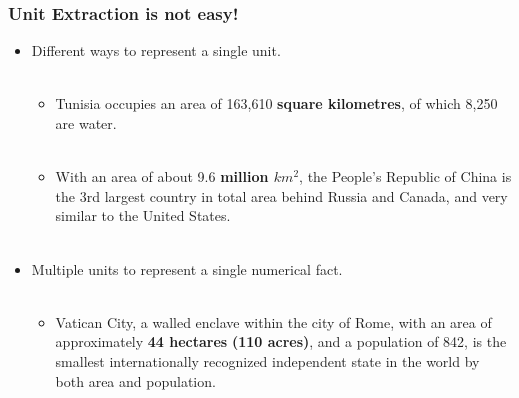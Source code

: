 \documentclass{beamer}
\begin{document}
\begin{frame}
 \frametitle{Unit Extraction is not easy!} \pause
 
 \begin{itemize}
    \item Different ways to represent a single unit. \pause \\~\\
    
    \begin{itemize}
     \item Tunisia occupies an area of 163,610 \textbf{square kilometres}, of which 8,250 are water. \pause \\~\\
     \item With an area of about 9.6 \textbf{million $km^{2}$}, the People's Republic of China is the 3rd largest country in total area behind Russia and Canada, and very similar to the United States. \\~\\    \end{itemize}
\pause
    
    \item Multiple units to represent a single numerical fact. \pause \\~\\
    \begin{itemize}
      \item Vatican City, a walled enclave within the city of Rome, with an area of approximately \textbf{44 hectares} \textbf{(110 acres)}, and a population of 842, is the smallest internationally recognized independent state in the world by both area and population. \\~\\
    \end{itemize}
 \end{itemize}
\end{frame}
\end{document}
